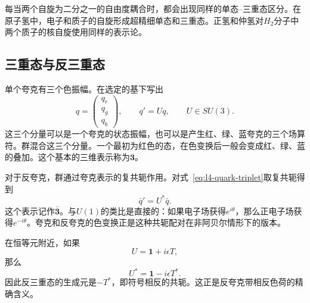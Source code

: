 每当两个自旋为二分之一的自由度耦合时，都会出现同样的单态--三重态区分。在原子氢中，电子和质子的自旋形成超精细单态和三重态。正氢和仲氢对\(H_2\)分子中两个质子的核自旋使用同样的表示论。

\subsection{三重态与反三重态}

单个夸克有三个色振幅。在选定的基下写出
\begin{equation}
q=
\begin{pmatrix}
q_r\\q_g\\q_b
\end{pmatrix},
\qquad
q'=Uq,
\qquad U\in SU(3).
\label{eq:l4-quark-triplet}
\end{equation}
这三个分量可以是一个夸克的状态振幅，也可以是产生红、绿、蓝夸克的三个场算符。群混合这三个分量。一个最初为红色的态，在色变换后一般会变成红、绿、蓝的叠加。这个基本的三维表示称为\(\boldsymbol 3\)。

对于反夸克，群通过夸克表示的复共轭作用。对式~\eqref{eq:l4-quark-triplet}取复共轭得到
\begin{equation}
\bar q'=U^*\bar q.
\end{equation}
这个表示记作\(\bar{\boldsymbol 3}\)。与\(U(1)\)的类比是直接的：如果电子场获得\(e^{i\theta}\)，那么正电子场获得\(e^{-i\theta}\)。夸克和反夸克的色变换正是这种共轭配对在非阿贝尔情形下的版本。

在恒等元附近，如果
\begin{equation}
U=\boldsymbol 1+i\epsilon T,
\end{equation}
那么
\begin{equation}
U^*=\boldsymbol 1-i\epsilon T^*.
\end{equation}
因此反三重态的生成元是\(-T^*\)，即符号相反的共轭。这正是反夸克带相反色荷的精确含义。

\begin{classroomqa}
\end{classroomqa}

